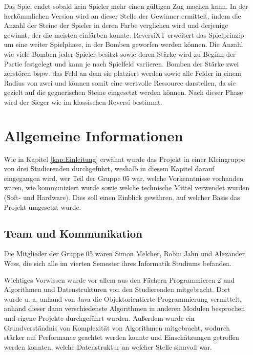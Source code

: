 \documentclass[12pt,a4paper,bibliography=totocnumbered,listof=totocnumbered]{article}
\begin{document}
Das Spiel endet sobald kein Spieler mehr einen gültigen Zug machen kann. In der herkömmlichen Version wird an dieser Stelle der Gewinner ermittelt, indem die Anzahl der Steine der Spieler in deren Farbe verglichen wird und derjenige gewinnt, der die meisten einfärben konnte. ReversiXT erweitert das Spielprinzip um eine weiter Spielphase, in der Bomben geworfen werden können. Die Anzahl wie viele Bomben jeder Spieler besitzt sowie deren Stärke wird zu Beginn der Partie festgelegt und kann je nach Spielfeld variieren. Bomben der Stärke zwei zerstören bspw. das Feld an dem sie platziert werden sowie alle Felder in einem Radius von zwei und können somit eine wertvolle Ressource darstellen, da sie gezielt auf die gegnerischen Steine eingesetzt werden können. Nach dieser Phase wird der Sieger wie im klassischen Reversi bestimmt.


\newpage
\section{Allgemeine Informationen}
Wie in Kapitel \ref{kap:Einleitung} erwähnt wurde das Projekt in einer Kleingruppe von drei Studierenden durchgeführt, weshalb in diesem Kapitel darauf eingegangen wird, wer Teil der Gruppe 05 war, welche Vorkenntnisse vorhanden waren, wie kommuniziert wurde sowie welche technische Mittel verwendet wurden (Soft- und Hardware). Dies soll einen Einblick gewähren, auf welcher Basis das Projekt umgesetzt wurde.

\subsection{Team und Kommunikation}
Die Mitglieder der Gruppe 05 waren Simon Melcher, Robin Jahn und Alexander Wess, die sich alle im vierten Semester ihres Informatik Studiums befanden.

Wichtiges Vorwissen wurde vor allem aus den Fächern Programmieren 2 und Algorithmen und Datenstrukturen von den Studierenden mitgebracht. Dort wurde u. a. anhand von Java die Objektorientierte Programmierung vermittelt, anhand dieser dann verschiedenste Algorithmen in anderen Modulen besprochen und eigene Projekte durchgeführt wurden. Außerdem wurde ein Grundverständnis von Komplexität von Algorithmen mitgebracht, wodurch stärker auf Performance geachtet werden konnte und Einschätzungen getroffen werden konnten, welche Datenstruktur an welcher Stelle sinnvoll war.
\end{document}
